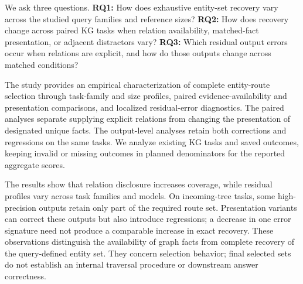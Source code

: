 We ask three questions. \textbf{RQ1:} How does exhaustive entity-set recovery vary across the studied query families and reference sizes? \textbf{RQ2:} How does recovery change across paired KG tasks when relation availability, matched-fact presentation, or adjacent distractors vary? \textbf{RQ3:} Which residual output errors occur when relations are explicit, and how do those outputs change across matched conditions?

The study provides an empirical characterization of complete entity-route selection through task-family and size profiles, paired evidence-availability and presentation comparisons, and localized residual-error diagnostics. The paired analyses separate supplying explicit relations from changing the presentation of designated unique facts. The output-level analyses retain both corrections and regressions on the same tasks. We analyze existing KG tasks and saved outcomes, keeping invalid or missing outcomes in planned denominators for the reported aggregate scores.

The results show that relation disclosure increases coverage, while residual profiles vary across task families and models. On incoming-tree tasks, some high-precision outputs retain only part of the required route set. Presentation variants can correct these outputs but also introduce regressions; a decrease in one error signature need not produce a comparable increase in exact recovery. These observations distinguish the availability of graph facts from complete recovery of the query-defined entity set. They concern selection behavior; final selected sets do not establish an internal traversal procedure or downstream answer correctness.
